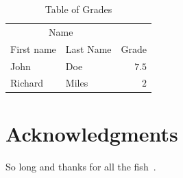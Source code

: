 \documentclass[fleqn,10pt]{SelfArx} %
\begin{document}
\begin{table}[hbt]
\caption{Table of Grades}
\centering
\begin{tabular}{llr}
\toprule
\multicolumn{2}{c}{Name} \\
\cmidrule(r){1-2}
First name & Last Name & Grade \\
\midrule
John & Doe & $7.5$ \\
Richard & Miles & $2$ \\
\bottomrule
\end{tabular}
\label{tab:label}
\end{table}

\section*{Acknowledgments} %


So long and thanks for all the fish~\cite{svm}.




\end{document}
